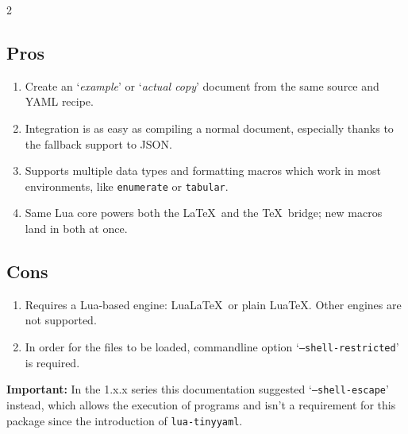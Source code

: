 \documentclass{ltxdoc}
\begin{document}
    \begin{multicols}{2}
        \subsection{Pros}
        \begin{enumerate}[align=left]
            \item Create an `\textit{example}' or `\textit{actual copy}' document from the same source and YAML recipe.
            \item Integration is as easy as compiling a normal document, especially thanks to the fallback support to JSON.
            \item Supports multiple data types and formatting macros which work in most environments, like \texttt{enumerate} or \texttt{tabular}.
            \item Same Lua core powers both the \LaTeX\ and the \TeX\ bridge; new macros land in both at once.
        \end{enumerate}
        \columnbreak
        \subsection{Cons}
        \begin{enumerate}[align=left]
            \item Requires a Lua-based engine: Lua\LaTeX\ or plain Lua\TeX. Other engines are not supported.
            \item In order for the files to be loaded, commandline option `\texttt{--shell-restricted}' is required.
        \end{enumerate}
        \textbf{Important:} In the 1.x.x series this documentation suggested `\texttt{--shell-escape}' instead, which allows the execution of programs and isn't a requirement for this package since the introduction of \texttt{lua-tinyyaml}.
    \end{multicols}
\end{document}

